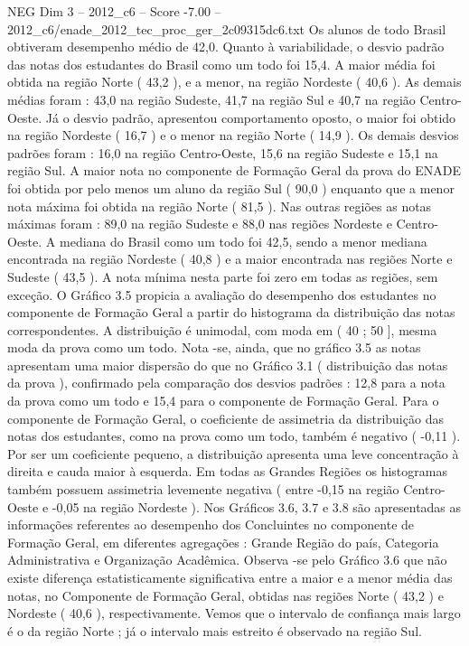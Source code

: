 \begin{textsample}{NEG Dim 3 – 2012\_c6 – Score -7.00 – 2012\_c6/enade\_2012\_tec\_proc\_ger\_2c09315dc6.txt}
Os alunos de todo Brasil obtiveram desempenho médio de 42,0.
Quanto à variabilidade, o desvio padrão das notas dos estudantes do Brasil como um todo foi 15,4.
A maior média foi obtida na região Norte ( 43,2 ), e a menor, na região Nordeste ( 40,6 ).
As demais médias foram : 43,0 na região Sudeste, 41,7 na região Sul e 40,7 na região Centro-Oeste.
Já o desvio padrão, apresentou comportamento oposto, o maior foi obtido na região Nordeste ( 16,7 ) e o menor na região Norte ( 14,9 ).
Os demais desvios padrões foram : 16,0 na região Centro-Oeste, 15,6 na região Sudeste e 15,1 na região Sul.
A maior nota no componente de Formação Geral da prova do ENADE foi obtida por pelo menos um aluno da região Sul ( 90,0 ) enquanto que a menor nota máxima foi obtida na região Norte ( 81,5 ).
Nas outras regiões as notas máximas foram : 89,0 na região Sudeste e 88,0 nas regiões Nordeste e Centro-Oeste.
A mediana do Brasil como um todo foi 42,5, sendo a menor mediana encontrada na região Nordeste ( 40,8 ) e a maior encontrada nas regiões Norte e Sudeste ( 43,5 ).
A nota mínima nesta parte foi zero em todas as regiões, sem exceção.
O Gráfico 3.5 propicia a avaliação do desempenho dos estudantes no componente de Formação Geral a partir do histograma da distribuição das notas correspondentes.
A distribuição é unimodal, com moda em ( 40 ; 50 ], mesma moda da prova como um todo.
Nota -se, ainda, que no gráfico 3.5 as notas apresentam uma maior dispersão do que no Gráfico 3.1 ( distribuição das notas da prova ), confirmado pela comparação dos desvios padrões : 12,8 para a nota da prova como um todo e 15,4 para o componente de Formação Geral.
Para o componente de Formação Geral, o coeficiente de assimetria da distribuição das notas dos estudantes, como na prova como um todo, também é negativo ( -0,11 ).
Por ser um coeficiente pequeno, a distribuição apresenta uma leve concentração à direita e cauda maior à esquerda.
Em todas as Grandes Regiões os histogramas também possuem assimetria levemente negativa ( entre -0,15 na região Centro-Oeste e -0,05 na região Nordeste ).
Nos Gráficos 3.6, 3.7 e 3.8 são apresentadas as informações referentes ao desempenho dos Concluintes no componente de Formação Geral, em diferentes agregações : Grande Região do país, Categoria Administrativa e Organização Acadêmica.
Observa -se pelo Gráfico 3.6 que não existe diferença estatisticamente significativa entre a maior e a menor média das notas, no Componente de Formação Geral, obtidas nas regiões Norte ( 43,2 ) e Nordeste ( 40,6 ), respectivamente.
Vemos que o intervalo de confiança mais largo é o da região Norte ; já o intervalo mais estreito é observado na região Sul.

\end{textsample}
